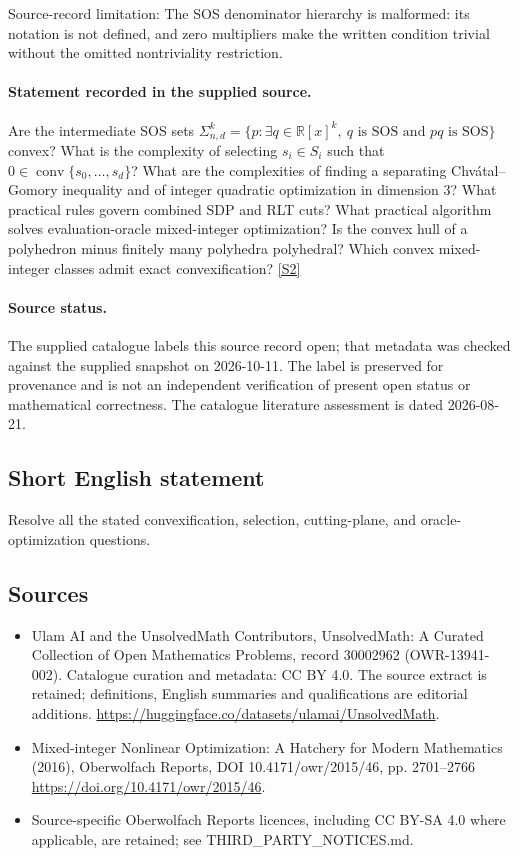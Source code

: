 \documentclass[11pt]{article}
\begin{document}
Source-record limitation: The SOS denominator hierarchy is malformed: its notation is not defined, and zero multipliers make the written condition trivial without the omitted nontriviality restriction.
\paragraph{Statement recorded in the supplied source.}
Are the intermediate SOS sets $\Sigma^k_{n,d}=\{p:\exists q\in\mathbb{R}[x]^k,\ q\text{ is SOS and }pq\text{ is SOS}\}$ convex? What is the complexity of selecting $s_i\in S_i$ such that $0\in\operatorname{conv}\{s_0,\ldots,s_d\}$? What are the complexities of finding a separating Chvátal–Gomory inequality and of integer quadratic optimization in dimension $3$? What practical rules govern combined SDP and RLT cuts? What practical algorithm solves evaluation-oracle mixed-integer optimization? Is the convex hull of a polyhedron minus finitely many polyhedra polyhedral? Which convex mixed-integer classes admit exact convexification? \href{https://doi.org/10.4171/owr/2015/46}{[S2]}
\paragraph{Source status.}
The supplied catalogue labels this source record open; that metadata was checked against the supplied snapshot on 2026-10-11. The label is preserved for provenance and is not an independent verification of present open status or mathematical correctness. The catalogue literature assessment is dated 2026-08-21.
\subsection{Short English statement}
Resolve all the stated convexification, selection, cutting-plane, and oracle-optimization questions.
\subsection{Sources}
\begin{itemize}
\item[S1] Ulam AI and the UnsolvedMath Contributors, UnsolvedMath: A Curated Collection of Open Mathematics Problems, record 30002962 (OWR-13941-002). Catalogue curation and metadata: CC BY 4.0. The source extract is retained; definitions, English summaries and qualifications are editorial additions.
\url{https://huggingface.co/datasets/ulamai/UnsolvedMath}.
\item[S2] Mixed-integer Nonlinear Optimization: A Hatchery for Modern Mathematics (2016), Oberwolfach Reports, DOI 10.4171/owr/2015/46, pp. 2701--2766
\url{https://doi.org/10.4171/owr/2015/46}.
\item Source-specific Oberwolfach Reports licences, including CC BY-SA 4.0 where applicable, are retained; see THIRD\_PARTY\_NOTICES.md.
\end{itemize}
\end{document}
